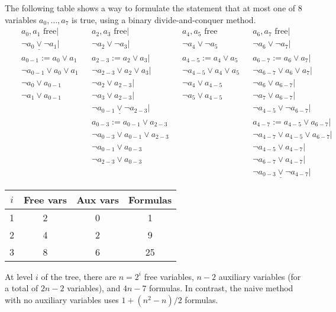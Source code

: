 \documentclass{article}
\begin{document}
The following table shows a way to formulate the statement
that at most one of 8 variables $a_0, \ldots, a_7$ is true,
using a binary divide-and-conquer method.
\begin{align*}
  && a_0, a_1 \text{ free}|
  && a_2, a_3 \text{ free}|
  && a_4, a_5 \text{ free}
  && a_6, a_7 \text{ free}| \\
  && \underline{\lnot a_0 \lor \lnot a_1}|
  && \lnot a_2 \lor \lnot a_3|
  && \lnot a_4 \lor \lnot a_5
  && \lnot a_6 \lor \lnot a_7| \\
  && a_{0-1} := a_0 \lor a_1
  && a_{2-3} := a_2 \lor a_3|
  && a_{4-5} := a_4 \lor a_5
  && a_{6-7} := a_6 \lor a_7| \\
  && \lnot a_{0-1} \lor a_0 \lor a_1
  && \lnot a_{2-3} \lor a_2 \lor a_3|
  && \lnot a_{4-5} \lor a_4 \lor a_5
  && \lnot a_{6-7} \lor a_6 \lor a_7| \\
  && \lnot a_0 \lor a_{0-1}
  && \lnot a_2 \lor a_{2-3}|
  && \lnot a_4 \lor a_{4-5}
  && \lnot a_6 \lor a_{6-7}| \\
  && \lnot a_1 \lor a_{0-1}
  && \lnot a_3 \lor a_{2-3}|
  && \lnot a_5 \lor a_{4-5}
  && \lnot a_7 \lor a_{6-7}| \\
  && && \underline{\lnot a_{0-1} \lor \lnot  a_{2-3}}|
  && && \lnot a_{4-5} \lor \lnot  a_{6-7}| \\
  && && a_{0-3} := a_{0-1} \lor a_{2-3}
  && && a_{4-7} := a_{4-5} \lor a_{6-7}| \\
  && && \lnot a_{0-3} \lor a_{0-1} \lor a_{2-3}
  && && \lnot a_{4-7} \lor a_{4-5} \lor a_{6-7}| \\
  && && \lnot a_{0-1} \lor a_{0-3}
  && && \lnot a_{4-5} \lor a_{4-7}| \\
  && && \lnot a_{2-3} \lor a_{0-3}
  && && \lnot a_{6-7} \lor a_{4-7}| \\
  && && && && \underline{\lnot a_{0-3} \lor \lnot a_{4-7}}|
\end{align*}
\begin{center}
  \begin{tabular}{|c|c|c|c|}
    \hline
    $i$ & Free vars & Aux vars & Formulas \\ \hline
    1 & 2 & 0 & 1 \\ \hline
    2 & 4 & 2 & 9 \\ \hline
    3 & 8 & 6 & 25 \\ \hline
  \end{tabular}
\end{center}
At level $i$ of the tree,
there are $n=2^i$ free variables,
$n-2$ auxiliary variables
(for a total of $2n-2$ variables),
and $4n-7$ formulas.
In contrast,
the naive method with no auxiliary variables
uses $1+(n^2-n)/2$ formulas.
\end{document}
